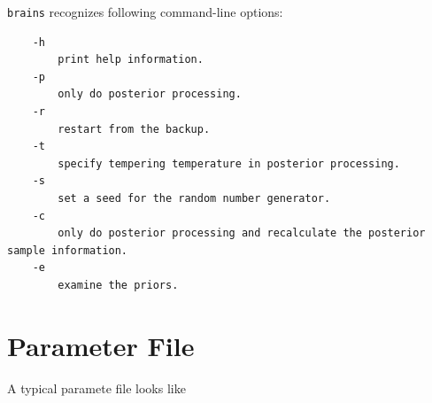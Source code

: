 \documentclass[oneside]{book}
\begin{document}
\texttt{brains} recognizes following command-line options:
\begin{shaded}
\scriptsize
\begin{verbatim}
    -h
        print help information.
    -p
        only do posterior processing.
    -r
        restart from the backup.
    -t
        specify tempering temperature in posterior processing.
    -s 
        set a seed for the random number generator.
    -c
        only do posterior processing and recalculate the posterior sample information.
    -e
        examine the priors.
\end{verbatim}
\end{shaded}


\section{Parameter File}
A typical paramete file looks like
\end{document}
